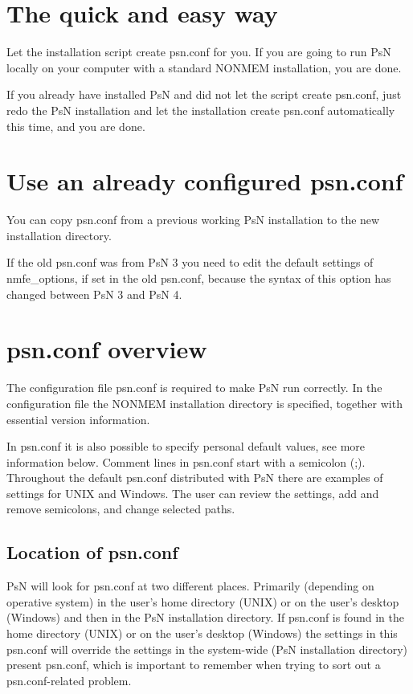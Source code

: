 
\usepackage{hyperref}


\maketitle
\tableofcontents
\newpage

\section{The quick and easy way}
Let the installation script create psn.conf for you. If you are going to run PsN locally on your computer with a standard NONMEM installation, you are done.

If you already have installed PsN and did not let the script create psn.conf, just redo the PsN installation and let the installation create psn.conf automatically this time, and you are done.

\section{Use an already configured psn.conf}
You can copy psn.conf from a previous working PsN installation to the new installation directory. 

If the old psn.conf was from PsN 3 you need to edit the default settings of nmfe\_options, if set in the old psn.conf, because the syntax of this option has changed between PsN 3 and PsN 4.

\section{psn.conf overview}
The configuration file psn.conf is required to make PsN run correctly. In the configuration file the NONMEM installation directory is specified, together with essential version information. 

In psn.conf it is also possible to specify personal default values, see more information below. Comment lines in psn.conf start with a semicolon (;). Throughout the default psn.conf distributed with PsN there are examples of settings for UNIX and Windows. The user can review the settings, add and remove semicolons, and change selected paths.

\subsection{Location of psn.conf}
PsN will look for psn.conf at two different places. Primarily (depending on operative system) in the user's home directory (UNIX) or on the user's desktop (Windows) and then in the PsN installation directory. If psn.conf is found in the home directory (UNIX) or on the user's desktop (Windows) the settings in this psn.conf will override the settings in the system-wide (PsN installation directory) present psn.conf, which is important to remember when trying to sort out a psn.conf-related problem.

